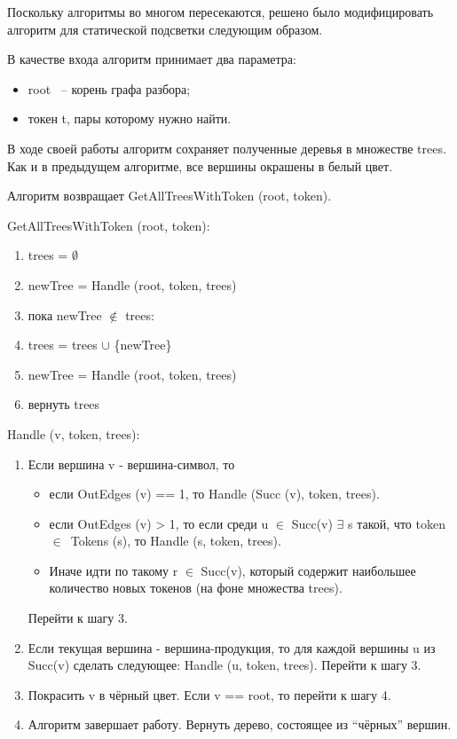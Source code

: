 Поскольку алгоритмы во многом пересекаются, решено было модифицировать алгоритм для статической подсветки следующим образом. 

В качестве входа алгоритм принимает два параметра:
\begin{itemize}
\item root ~-- корень графа разбора;
\item токен t, пары которому нужно найти.
\end{itemize}

В ходе своей работы алгоритм сохраняет полученные деревья в множестве trees. Как и в предыдущем алгоритме, все вершины окрашены в белый цвет.

Алгоритм возвращает GetAllTreesWithToken (root, token).

GetAllTreesWithToken (root, token):
\begin{enumerate}
\item trees = $\emptyset$
\item newTree = Handle (root, token, trees)
\item пока newTree $\notin$ trees:
\item \qquad trees = trees $\cup$ \{newTree\}
\item \qquad newTree = Handle (root, token, trees)
\item вернуть trees
\end{enumerate}		
		
Handle (v, token, trees):
\begin{enumerate}
\item Если вершина v - вершина-символ, то 
    \begin{itemize}
        \item если OutEdges (v) == 1, то Handle (Succ (v), token, trees).
        \item если OutEdges (v) > 1, то если среди u $\in$ Succ(v) $\exists$ s такой, что token $\in$~Tokens (s), то Handle (s, token, trees). 
        \item Иначе идти по такому r $\in$ Succ(v), который содержит наибольшее количество новых токенов (на фоне множества trees). 
	\end{itemize}
	Перейти к шагу 3.
\item Если текущая вершина - вершина-продукция, то для каждой вершины u из Succ(v) сделать следующее:  Handle (u, token, trees). Перейти к шагу 3.
\item Покрасить v в чёрный цвет. Если v == root, то перейти к шагу 4.
\item Алгоритм завершает работу. Вернуть дерево, состоящее из “чёрных” вершин. 
\end{enumerate}


